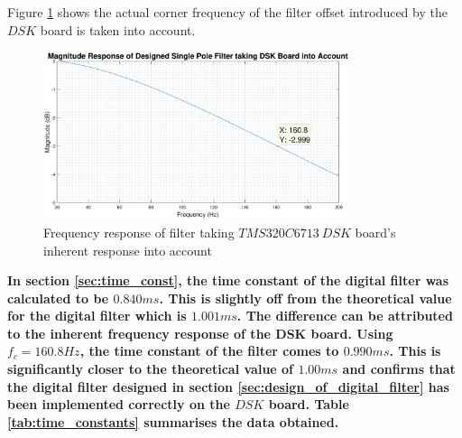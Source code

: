 \documentclass{article}
\begin{document}
Figure \ref{fig:time_constat_actual} shows the actual corner frequency of the filter offset introduced by the $DSK$ board is taken into account. 

\begin{figure}[H]
    \centering
    \includegraphics[width=0.8\textwidth]{time_constant_measured}
    \caption{Frequency response of filter taking  $TMS320C6713 \ DSK$ board's inherent response into account}
    \label{fig:time_constat_actual}
\end{figure}

\newpage
\textbf{In section \ref{sec:time_const}, the time constant of the digital filter was calculated to be $0.840ms$. This is slightly off from the theoretical value for the digital filter which is $1.001ms$. The difference can be attributed to the inherent frequency response of the DSK board. Using $f_{c} = 160.8Hz$, the time constant of the filter comes to $0.990ms$. This is significantly closer to the theoretical value of $1.00ms$ and confirms that the digital filter designed in section \ref{sec:design_of_digital_filter} has been implemented correctly on the $DSK$ board. Table \ref{tab:time_constants} summarises the data obtained.}
\end{document}
